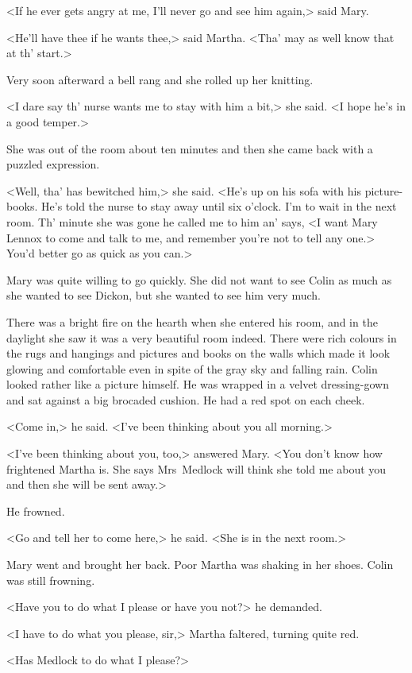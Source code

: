 <If he ever gets angry at me, I'll never go and see him again,> said Mary.

<He'll have thee if he wants thee,> said Martha. <Tha' may as well know that at th' start.>

Very soon afterward a bell rang and she rolled up her knitting.

<I dare say th' nurse wants me to stay with him a bit,> she said. <I hope he's in a good temper.>

She was out of the room about ten minutes and then she came back with a puzzled expression.

<Well, tha' has bewitched him,> she said. <He's up on his sofa with his picture-books. He's told the nurse to stay away until six o'clock. I'm to wait in the next room. Th' minute she was gone he called me to him an' says, <I want Mary Lennox to come and talk to me, and remember you're not to tell any one.> You'd better go as quick as you can.>

Mary was quite willing to go quickly. She did not want to see Colin as much as she wanted to see Dickon, but she wanted to see him very much.

There was a bright fire on the hearth when she entered his room, and in the daylight she saw it was a very beautiful room indeed. There were rich colours in the rugs and hangings and pictures and books on the walls which made it look glowing and comfortable even in spite of the gray sky and falling rain. Colin looked rather like a picture himself. He was wrapped in a velvet dressing-gown and sat against a big brocaded cushion. He had a red spot on each cheek.

<Come in,> he said. <I've been thinking about you all morning.>

<I've been thinking about you, too,> answered Mary. <You don't know how frightened Martha is. She says Mrs~Medlock will think she told me about you and then she will be sent away.>

He frowned.

<Go and tell her to come here,> he said. <She is in the next room.>

Mary went and brought her back. Poor Martha was shaking in her shoes. Colin was still frowning.

<Have you to do what I please or have you not?> he demanded.

<I have to do what you please, sir,> Martha faltered, turning quite red.

<Has Medlock to do what I please?>

